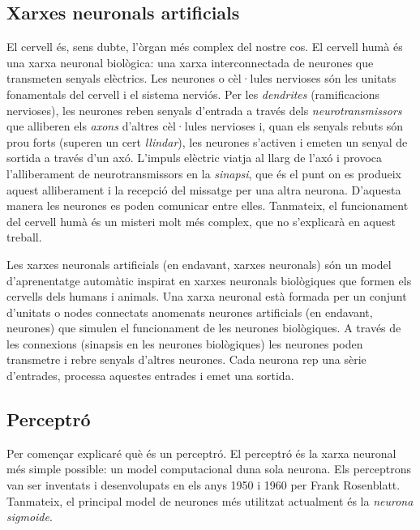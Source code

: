 \begin{refsection}

	\chapter{Xarxes neuronals artificials}
	\label{chap:ANN}

	El cervell és, sens dubte, l'òrgan més complex del nostre cos. El cervell humà és una xarxa neuronal biològica: una xarxa interconnectada de neurones que transmeten senyals elèctrics. Les neurones o cèl·lules nervioses són les unitats fonamentals del cervell i el sistema nerviós. Per les \textit{dendrites} (ramificacions nervioses), les neurones reben senyals d'entrada a través dels \textit{neurotransmissors} que alliberen els \textit{axons} d'altres cèl·lules nervioses i, quan els senyals rebuts són prou forts (superen un cert \textit{llindar}), les neurones s'activen i emeten un senyal de sortida a través d'un axó. L'impuls elèctric viatja al llarg de l'axó i provoca l'alliberament de neurotransmissors en la \textit{sinapsi}, que és el punt on es produeix aquest alliberament i la recepció del missatge per una altra neurona.\supercite{ANNBeginners} D'aquesta manera les neurones es poden comunicar entre elles. Tanmateix, el funcionament del cervell humà és un misteri molt més complex, que no s'explicarà en aquest treball.

	Les xarxes neuronals artificials (en endavant, xarxes neuronals) són un model d'aprenentatge automàtic inspirat en xarxes neuronals biològiques que formen els cervells dels humans i animals. Una xarxa neuronal està formada per un conjunt d'unitats o nodes connectats anomenats neurones artificials (en endavant, neurones) que simulen el funcionament de les neurones biològiques. A través de les connexions (sinapsis en les neurones biològiques) les neurones poden transmetre i rebre senyals d'altres neurones. Cada neurona rep una sèrie d'entrades, processa aquestes entrades i emet una sortida.\supercite{ANNFundamentals}

	\section{Perceptró}

	Per començar explicaré què és un perceptró. El perceptró és la xarxa neuronal més simple possible: un model computacional duna sola neurona. Els perceptrons van ser inventats i desenvolupats en els anys 1950 i 1960 per Frank Rosenblatt.\supercite{principles} Tanmateix, el principal model de neurones més utilitzat actualment és la \textit{neurona sigmoide}.


\end{refsection}

